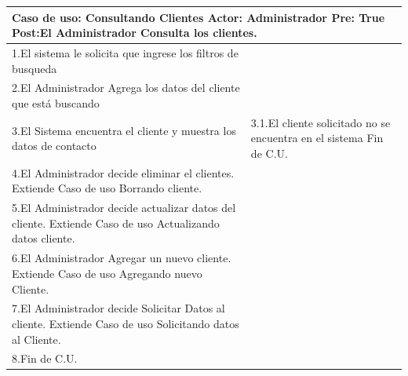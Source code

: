 \begin{longtable}{| p{} | p{} |} 
    \hline
    \multicolumn{2}{|p{16cm}|}{
        \textbf{Caso de uso:} Consultando Clientes \newline
        \textbf{Actor:} Administrador\newline
        \textbf{Pre:}  True\newline
        \textbf{Post:}El Administrador Consulta los clientes.
    }\\
    \hline
    1.El sistema le solicita que ingrese los filtros de busqueda  & \\
    \hline
    2.El Administrador Agrega los datos del cliente que está buscando& \\
    \hline
    3.El Sistema encuentra el cliente y muestra los datos de contacto & 3.1.El cliente solicitado no se encuentra en el sistema \newline 3.2 Fin de C.U.  \\
    \hline
    4.El Administrador decide eliminar el clientes. Extiende Caso de uso Borrando cliente.& \\
    \hline
    5.El Administrador decide actualizar datos del cliente. Extiende Caso de uso Actualizando datos cliente.& \\
    \hline
    6.El Administrador Agregar un nuevo cliente. Extiende Caso de uso Agregando nuevo Cliente.& \\
    \hline
    7.El Administrador decide Solicitar Datos al cliente. Extiende Caso de uso Solicitando datos al Cliente.& \\
    \hline
    8.Fin de C.U.& \\
    \hline
\end{longtable}

